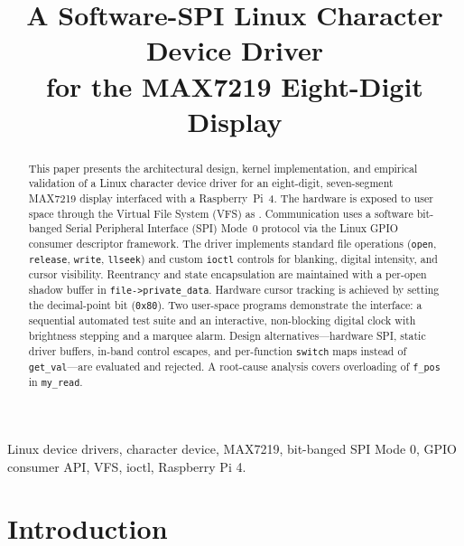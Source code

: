 \documentclass[conference,a4paper]{IEEEtran}
\begin{document}
\title{A Software-SPI Linux Character Device Driver\\for the MAX7219 Eight-Digit Display}

\author{
}

\maketitle

\begin{abstract}
This paper presents the architectural design, kernel implementation, and empirical validation of a Linux character device driver for an eight-digit, seven-segment MAX7219 display interfaced with a Raspberry~Pi~4. The hardware is exposed to user space through the Virtual File System (VFS) as . Communication uses a software bit-banged Serial Peripheral Interface (SPI) Mode~0 protocol via the Linux GPIO consumer descriptor framework. The driver implements standard file operations (\texttt{open}, \texttt{release}, \texttt{write}, \texttt{llseek}) and custom \texttt{ioctl} controls for blanking, digital intensity, and cursor visibility. Reentrancy and state encapsulation are maintained with a per-open shadow buffer in \texttt{file->private\_data}. Hardware cursor tracking is achieved by setting the decimal-point bit (\texttt{0x80}). Two user-space programs demonstrate the interface: a sequential automated test suite and an interactive, non-blocking digital clock with brightness stepping and a marquee alarm. Design alternatives---hardware SPI, static driver buffers, in-band control escapes, and per-function \texttt{switch} maps instead of \texttt{get\_val}---are evaluated and rejected. A root-cause analysis covers overloading of \texttt{f\_pos} in \texttt{my\_read}.
\end{abstract}

\begin{IEEEkeywords}
Linux device drivers, character device, MAX7219, bit-banged SPI Mode 0, GPIO consumer API, VFS, ioctl, Raspberry Pi 4.
\end{IEEEkeywords}

\section{Introduction}
\end{document}
